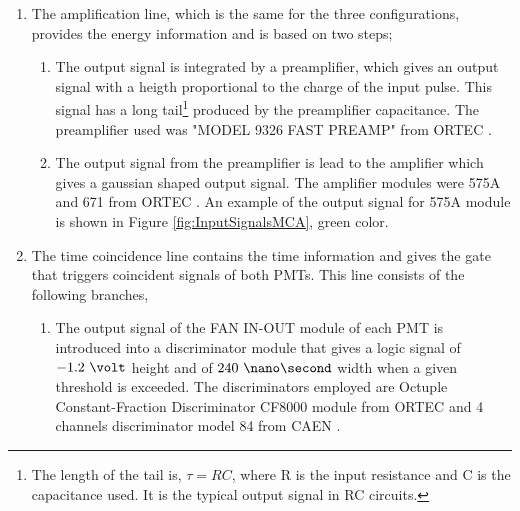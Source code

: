 \begin{enumerate}

\item{} The amplification line, which is the same for the three configurations, provides the energy information and is based on two steps;



\begin{enumerate}

\item{} The output signal is integrated by a preamplifier, which gives an output signal with a heigth proportional to the charge of the input pulse. This signal has a long tail\footnote{The length of the tail is, $\tau=RC$, where R is the input resistance and C is the capacitance used. It is the typical output signal in RC circuits.} produced by the preamplifier capacitance. The preamplifier used was "MODEL 9326 FAST PREAMP" from ORTEC \cite{DataSheetPreAmp}.

\item{} The output signal from the preamplifier is lead to the amplifier which gives a gaussian shaped output signal. The amplifier modules were 575A and 671 from ORTEC \cite{DataSheet575Amp, DataSheet671Amp}. An example of the output signal for 575A module is shown in Figure \ref{fig:InputSignalsMCA}, green color.

\end{enumerate}

\item{} The time coincidence line contains the time information and gives the gate that triggers coincident signals of both PMTs. This line consists of the following branches,

\begin{enumerate}

\item{} The output signal of the FAN IN-OUT module of each PMT is introduced into a discriminator module that gives a logic signal of $-1.2~\volt$ height and of $240~\nano\second$ width when a given threshold is exceeded. The discriminators employed are  Octuple Constant-Fraction Discriminator CF8000 module from ORTEC \cite{DataSheetDiscriminator} and 4 channels discriminator model 84 from CAEN \cite{DataSheetDiscriminatorCAEN}.


\end{enumerate}
\end{enumerate}
